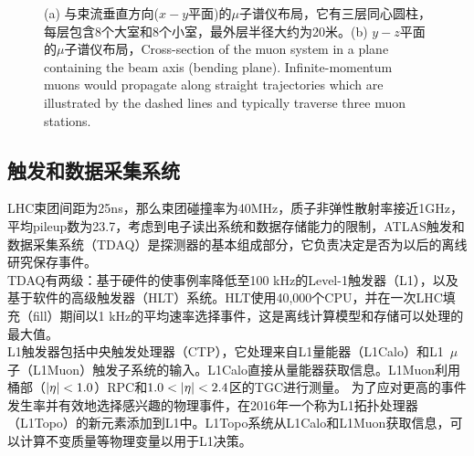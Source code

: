 \begin{figure}[h]
\begin{center}
\begin{subfigure}[b]{0.45\textwidth}
      \caption{}
      \label{fig:muon_rz}
  \end{subfigure}
\caption{(a) 与束流垂直方向($x-y$平面)的$\mu$子谱仪布局，它有三层同心圆柱，每层包含8个大室和8个小室，最外层半径大约为20米。(b) $y-z$平面的$\mu$子谱仪布局，Cross-section of the muon system in a plane containing the beam axis (bending plane). Infinite-momentum muons would propagate along straight trajectories which are illustrated by the dashed lines and typically traverse three muon stations.} \label{fig:muon_overview}
\end{center}
\end{figure}

\subsection{触发和数据采集系统}
LHC束团间距为25ns，那么束团碰撞率为40MHz，质子非弹性散射率接近1GHz，平均pileup数为23.7，考虑到电子读出系统和数据存储能力的限制，ATLAS触发和数据采集系统（TDAQ）\cite{Aaboud2017}是探测器的基本组成部分，它负责决定是否为以后的离线研究保存事件。\\
TDAQ有两级：基于硬件的使事例率降低至100 kHz的Level-1触发器（L1），以及基于软件的高级触发器（HLT）系统。HLT使用40,000个CPU，并在一次LHC填充（fill）期间以1 kHz的平均速率选择事件，这是离线计算模型和存储可以处理的最大值。\\
L1触发器包括中央触发处理器（CTP），它处理来自L1量能器（L1Calo）和L1~$\mu$子（L1Muon）触发子系统的输入。L1Calo直接从量能器获取信息。L1Muon利用桶部（$|\eta|<1.0$）RPC和$1.0<\abseta<2.4$区的TGC进行测量。
为了应对更高的事件发生率并有效地选择感兴趣的物理事件，在2016年一个称为L1拓扑处理器（L1Topo）\cite{Simioni:2014nha}的新元素添加到L1中。L1Topo系统从L1Calo和L1Muon获取信息，可以计算不变质量等物理变量以用于L1决策。
